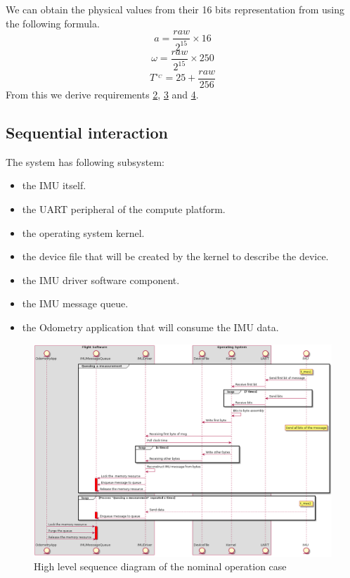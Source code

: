 We can obtain the physical values from their 16 bits representation from using the following formula.
\begin{equation}
    a = \frac{raw}{2^{15}} \times 16
\end{equation}
\begin{equation}
    \omega = \frac{raw}{2^{15}} \times 250
\end{equation}
\begin{equation}
    T^{\circ_C} = 25+\frac{raw}{256}
\end{equation}
From this we derive requirements \hyperref[req-2]{2}, \hyperref[req-3]{3} and \hyperref[req-4]{4}.


\subsection{Sequential interaction}
The system has following subsystem:
\begin{itemize}
    \item the IMU itself.
    \item the UART peripheral of the compute platform.
    \item the operating system kernel.
    \item the device file that will be created by the kernel to describe the device.
    \item the IMU driver software component.
    \item the IMU message queue.
    \item the Odometry application that will consume the IMU data.
\end{itemize}

\begin{figure}[H]
    \centering
    \includegraphics[width=1.0 \textwidth]{diagrams/high_level_sys_overview.png}
    \caption{High level sequence diagram of the nominal operation case}
    \label{fig-high-level-nominal}
\end{figure}

